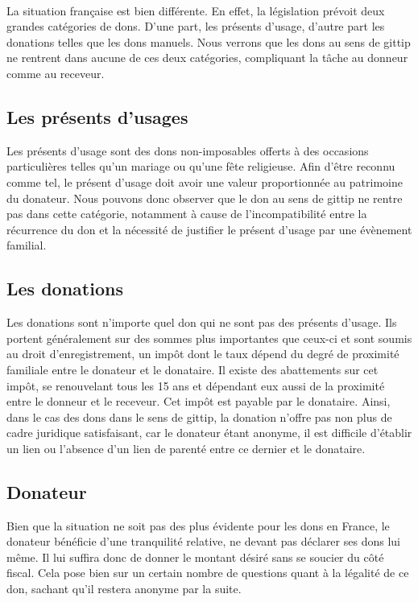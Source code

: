         \paragraph{}
            La situation française est bien différente. En effet, la
            législation prévoit deux grandes catégories de dons. D'une
            part, les présents d'usage, d'autre part les donations
            telles que les dons manuels. Nous verrons que les dons au sens
            de gittip ne rentrent dans aucune de ces deux catégories,
            compliquant la tâche au donneur comme au receveur.
        
        \subsection{Les présents d'usages}
            Les présents d'usage sont des dons non-imposables offerts à des
            occasions particulières telles qu'un mariage ou qu'une fête
            religieuse.
            Afin d'être reconnu comme tel, le présent d'usage doit avoir une 
            valeur proportionnée au patrimoine du donateur.
            Nous pouvons donc observer que le don au sens de gittip ne rentre
            pas dans cette catégorie, notamment à cause de l'incompatibilité
            entre la récurrence du don et la nécessité de justifier
            le présent d'usage par une évènement familial.

        \subsection{Les donations}
            Les donations sont n'importe quel don qui ne sont pas des présents
            d'usage. Ils portent généralement sur des sommes plus importantes
            que ceux-ci et sont soumis au droit d'enregistrement, un impôt
            dont le taux dépend du degré de proximité familiale entre le
            donateur et le donataire.
            Il existe des abattements sur cet impôt, se renouvelant tous
            les 15 ans et dépendant eux aussi de la proximité entre le
            donneur et le receveur. Cet impôt est payable par le donataire.
            Ainsi, dans le cas des dons dans le sens de gittip, la donation
            n'offre pas non plus de cadre juridique satisfaisant, car le 
            donateur étant anonyme, il est difficile d'établir un lien ou 
            l'absence d'un lien de parenté entre ce dernier et le donataire.
            
        \subsection{Donateur}
            Bien que la situation ne soit pas des plus évidente pour les dons
            en France, le donateur bénéficie d'une tranquilité relative, ne
            devant pas déclarer ses dons lui même. Il lui suffira donc de
            donner le montant désiré sans se soucier du côté fiscal. Cela
            pose bien sur un certain nombre de questions quant à la légalité
            de ce don, sachant qu'il restera anonyme par la suite.

